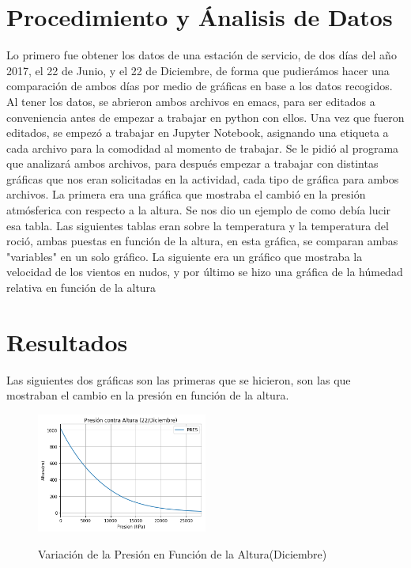 \documentclass{article}
\begin{document}
\section{Procedimiento y Ánalisis de Datos}
Lo primero fue obtener los datos de una estación de servicio, de dos días del año 2017, el 22 de Junio, y el 22 de Diciembre, de forma que pudierámos hacer una comparación de ambos días por medio de gráficas en base a los datos recogidos.
Al tener los datos, se abrieron ambos archivos en emacs, para ser editados a conveniencia antes de empezar a trabajar en python con ellos. Una vez que fueron editados, se empezó a trabajar en Jupyter Notebook, asignando una etiqueta a cada archivo para la comodidad al momento de trabajar.
Se le pidió al programa que analizará ambos archivos, para después empezar a trabajar con distintas gráficas que nos eran solicitadas en la actividad, cada tipo de gráfica para ambos archivos. La primera era una gráfica que mostraba el cambió en la presión atmósferica con respecto a la altura. Se nos dio un ejemplo de como debía lucir esa tabla.
Las siguientes tablas eran sobre la temperatura y la temperatura del roció, ambas puestas en función de la altura, en esta gráfica, se comparan ambas "variables" en un solo gráfico. La siguiente era un gráfico que mostraba la velocidad de los vientos en nudos, y por último se hizo una gráfica de la húmedad relativa en función de la altura

\section{Resultados}
Las siguientes dos gráficas son las primeras que se hicieron, son las que mostraban el cambio en la presión en función de la altura.
\begin{figure}[H]
    \caption{Variación de la Presión en Función de la Altura(Diciembre)}
    \includegraphics[width=0.5\textwidth]{VarPresion-AlturaDic.png}
    \centering
    \label{Pre-Alt}
\end{figure}
\end{document}
